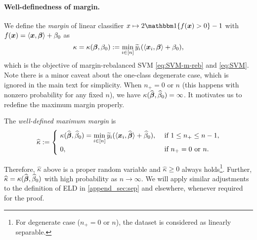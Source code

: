 \paragraph{Well-definedness of margin.}
We define the \emph{margin} of linear classifier $x \mapsto 2\ind\{ f(\xx) > 0 \} -1$ with $f(\text{\boldmath $x$}) = \langle \text{\boldmath $x$}, {\boldsymbol{\beta}} \rangle + \beta_0$ as 
\begin{equation}\label{eq:margin}
	\kappa = \kappa({\boldsymbol{\beta}}, \beta_0) := \min_{i \in [n]} \widetilde{y}_i ( \langle \text{\boldmath $x$}_i, \text{\boldmath $\beta$} \rangle + \beta_0 ),
\end{equation}
which is the objective of margin-rebalanced SVM \cref{eq:SVM-m-reb} and \eqref{eq:SVM}. Note there is a minor caveat about the one-class degenerate case, which is ignored in the main text for simplicity. When $n_+ = 0$ or $n$ (this happens with nonzero probability for any fixed $n$), we have $\kappa(\widehat{{\boldsymbol{\beta}}}, \widehat\beta_0) = \infty$. It motivates us to redefine the maximum margin properly.
\begin{defn}\label{def:max-margin}
	The \emph{well-defined maximum margin} is
	\begin{equation}\label{eq:kappa_hat_def}
		\widehat\kappa  := 
		\begin{cases} 
			\ \kappa(\widehat{{\boldsymbol{\beta}}}, \widehat\beta_0) = \displaystyle\min_{i \in [n]} \widetilde{y}_i ( \langle \text{\boldmath $x$}_i, \widehat{\text{\boldmath $\beta$}} \rangle + \widehat\beta_0 ) , 
			& \ \text{if} \ 1 \le n_+ \le n - 1, \\
			\ 0    , 
			& \ \text{if} \ n_+ = 0 \text{ or } n. 
		\end{cases}
	\end{equation}
\end{defn}
Therefore, $\hat\kappa$ above is a proper random variable and $\hat\kappa \ge 0$ always holds\footnote{For degenerate case ($n_+ = 0$ or $n$), the dataset is considered as linearly separable.}. Further, $\widehat{\kappa} = \kappa(\widehat{{\boldsymbol{\beta}}}, \widehat\beta_0)$ with high probability as $n \to \infty$. We will apply similar adjustments to the definition of ELD in \cref{append_sec:sep} and elsewhere, whenever required for the proof.



